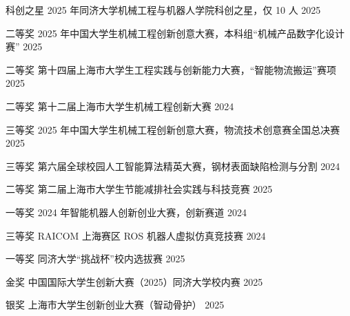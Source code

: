 
\begin{cvhonors}

  \cvhonor
    {科创之星}
    {2025 年同济大学机械工程与机器人学院科创之星，仅 10 人}
    {}
    {2025}

  \cvhonor
    {二等奖}
    {2025 年中国大学生机械工程创新创意大赛，本科组“机械产品数字化设计赛”}
    {}
    {2025}

  \cvhonor
    {二等奖}
    {第十四届上海市大学生工程实践与创新能力大赛，“智能物流搬运”赛项}
    {}
    {2025}

  \cvhonor
    {二等奖}
    {第十二届上海市大学生机械工程创新大赛}
    {}
    {2024}

  \cvhonor
    {三等奖}
    {2025 年中国大学生机械工程创新创意大赛，物流技术创意赛全国总决赛}
    {}
    {2025}

  \cvhonor
    {三等奖}
    {第六届全球校园人工智能算法精英大赛，钢材表面缺陷检测与分割}
    {}
    {2024}

  \cvhonor
    {二等奖}
    {第二届上海市大学生节能减排社会实践与科技竞赛}
    {}
    {2025}

  \cvhonor
    {一等奖}
    {2024 年智能机器人创新创业大赛，创新赛道}
    {}
    {2024}

  \cvhonor
    {三等奖}
    {RAICOM 上海赛区 ROS 机器人虚拟仿真竞技赛}
    {}
    {2024}

  \cvhonor
    {一等奖}
    {同济大学“挑战杯”校内选拔赛}
    {}
    {2025}

  \cvhonor
    {金奖}
    {中国国际大学生创新大赛（2025）同济大学校内赛}
    {}
    {2025}

  \cvhonor
    {银奖}
    {上海市大学生创新创业大赛（智动骨护）}
    {}
    {2025}

\end{cvhonors}
